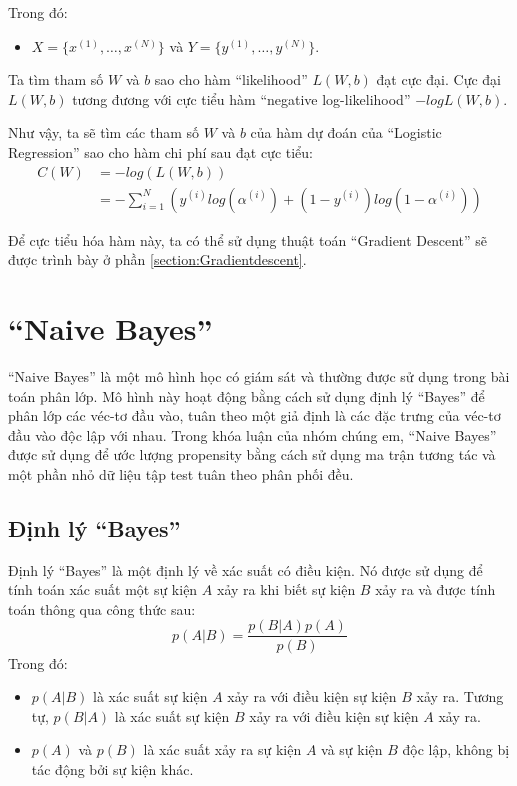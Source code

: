 Trong đó:
\begin{itemize}
    \item $X = \{x^{(1)}, \dots, x^{(N)} \}$ và $Y = \{y^{(1)}, \dots, y^{(N)} \}$.
\end{itemize}

Ta tìm tham số $W$ và $b$ sao cho hàm ``likelihood'' $L(W,b)$ đạt cực đại. Cực đại $L(W,b)$ tương đương với cực tiểu hàm ``negative log-likelihood'' $-logL(W,b)$.

Như vậy, ta sẽ tìm các tham số $W$ và $b$ của hàm dự đoán của ``Logistic Regression'' sao cho hàm chi phí sau đạt cực tiểu:
\begin{equation}\label{eq:2.2_C}
    \begin{split}
        C(W) &= -log(L(W,b))\\
        &= - \sum_{i=1}^{N} (y^{(i)} log(\alpha^{(i)}) + (1-y^{(i)})log(1-\alpha^{(i)}))
    \end{split}
\end{equation}


Để cực tiểu hóa hàm này, ta có thể sử dụng thuật toán ``Gradient Descent'' sẽ được trình bày ở phần \ref{section:Gradientdescent}.
\section{``Naive Bayes''}
``Naive Bayes'' là một mô hình học có giám sát và thường được sử dụng trong bài toán phân lớp. Mô hình này hoạt động bằng cách sử dụng định lý ``Bayes'' để phân lớp các véc-tơ đầu vào, tuân theo một giả định là các đặc trưng của véc-tơ đầu vào độc lập với nhau. Trong khóa luận của nhóm chúng em, ``Naive Bayes'' được sử dụng để ước lượng propensity bằng cách sử dụng ma trận tương tác và một phần nhỏ dữ liệu tập test tuân theo phân phối đều.
\subsection{Định lý ``Bayes''}
Định lý ``Bayes'' là một định lý về xác suất có điều kiện. Nó được sử dụng để tính toán xác suất một sự kiện $A$ xảy ra khi biết sự kiện $B$ xảy ra và được tính toán thông qua công thức sau:
\begin{equation}
    p(A|B) = \frac{p(B|A)p(A)}{p(B)}
    \label{eq:2.3_bayes}
\end{equation}
Trong đó:
\begin{itemize}
    \item $p(A|B)$ là xác suất sự kiện $A$ xảy ra với điều kiện sự kiện $B$ xảy ra. Tương tự, $p(B|A)$ là xác suất sự kiện $B$ xảy ra với điều kiện sự kiện $A$ xảy ra.
    \item $p(A)$ và $p(B)$ là xác suất xảy ra sự kiện $A$ và sự kiện $B$ độc lập, không bị tác động bởi sự kiện khác.
\end{itemize}
